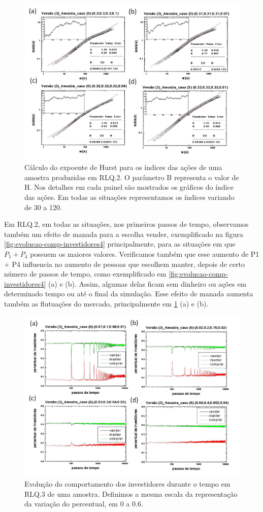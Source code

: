 \documentclass[brazil,ruledheader]{abnt}
\begin{document}
\begin{figure}[!h]
\centering
\includegraphics[width=0.8\linewidth]{Figuras/21.jpg}
\caption[Cálculo do expoente de Hurst para os índices em RLQ.2]{Cálculo do
expoente de Hurst para os índices das ações de uma amostra
produzidas em RLQ.2.  O parâmetro B representa o valor de H.
Nos detalhes em cada painel são mostrados os gráficos do índice das ações. Em
todas as situações representamos os índices variando de 30 a 120. }
\label{fig:calculo-exp-hurst8}
\end{figure}

Em RLQ.2, em todas as situações, nos primeiros passos de tempo, observamos
também um efeito de manada para a escolha vender, exemplificado na figura
\ref{fig:evolucao-comp-investidores4} principalmente, para as situações em que
$P_1 + P_4$ possuem os maiores valores. Verificamos também que esse aumento de
P1 + P4 influencia no aumento de pessoas que escolhem manter, depois de certo
número de passos de tempo, como exemplificado em
\ref{fig:evolucao-comp-investidores4} (a) e (b). Assim,  algumas
delas ficam sem dinheiro ou ações em determinado tempo ou até o final da
simulação. Esse efeito de manada aumenta também as flutuações do mercado,
principalmente em \ref{fig:calculo-exp-hurst8} (a) e (b).



\begin{figure}[!h]
\centering
\includegraphics[width=0.8\linewidth]{Figuras/22.jpg}
\caption [Evolução do comportamento dos investidores em RLQ.3]{Evolução do
comportamento dos investidores durante o tempo em RLQ.3 de uma amostra.
Definimos a mesma escala da representação da
variação do percentual, em 0 a 0.6.  }
\label{fig:evolucao-comp-investidores5}
\end{figure}
\end{document}
